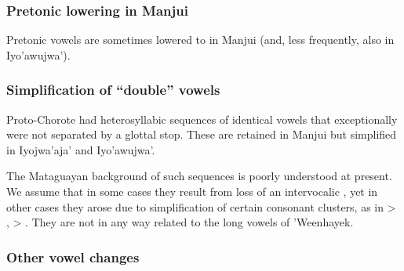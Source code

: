 \subsubsection{Pretonic lowering in Manjui}\label{ch-pret-v-l-mj}

Pretonic vowels are sometimes lowered to  in Manjui (and, less frequently, also in Iyo’awujwa’).

\begin{exe}
    \ex {}
    \ex {}
    \ex {}
    \ex {}
    \ex {}
\end{exe}

\subsubsection{Simplification of ``double'' vowels}

Proto-Chorote had heterosyllabic sequences of identical vowels that exceptionally were not separated by a glottal stop. These are retained in Manjui but simplified in Iyojwa’aja’ and Iyo’awujwa’.

\begin{exe}
    \ex {}
    \ex {}
    \ex {}
    \ex {}
    \ex {}
    \ex {}
\end{exe}

The Mataguayan background of such sequences is poorly understood at present. We assume that in some cases they result from loss of an intervocalic , yet in other cases they arose due to simplification of certain consonant clusters, as in  > ,  > . They are not in any way related to the long vowels of ’Weenhayek. 

\subsubsection{Other vowel changes}

